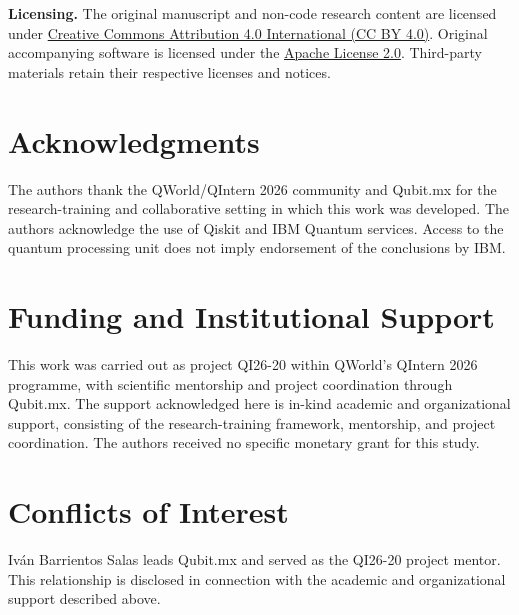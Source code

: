 \documentclass[11pt,a4paper]{article}
\begin{document}
\noindent\textbf{Licensing.} The original manuscript and non-code research content are licensed under \href{https://creativecommons.org/licenses/by/4.0/}{Creative Commons Attribution 4.0 International (CC BY 4.0)}. Original accompanying software is licensed under the \href{https://www.apache.org/licenses/LICENSE-2.0}{Apache License 2.0}. Third-party materials retain their respective licenses and notices.

\section*{Acknowledgments}
The authors thank the QWorld/QIntern 2026 community and Qubit.mx for the research-training and collaborative setting in which this work was developed. The authors acknowledge the use of Qiskit and IBM Quantum services. Access to the quantum processing unit does not imply endorsement of the conclusions by IBM.

\section*{Funding and Institutional Support}
This work was carried out as project QI26-20 within QWorld's QIntern 2026 programme, with scientific mentorship and project coordination through Qubit.mx. The support acknowledged here is in-kind academic and organizational support, consisting of the research-training framework, mentorship, and project coordination. The authors received no specific monetary grant for this study.

\section*{Conflicts of Interest}
Iván Barrientos Salas leads Qubit.mx and served as the QI26-20 project mentor. This relationship is disclosed in connection with the academic and organizational support described above.

\clearpage
\appendix





\clearpage


\end{document}
